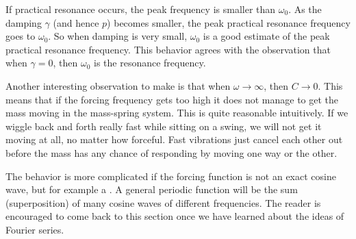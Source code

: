 \documentclass{ximera}
\begin{document}
If practical resonance occurs, the peak frequency is smaller than $\omega_0$.  As the damping $\gamma$ (and hence $p$) becomes smaller, the peak practical resonance frequency goes to $\omega_0$.  So when damping is very small, $\omega_0$ is a good estimate of the peak practical resonance frequency.  This behavior agrees with the observation that when $\gamma=0$, then $\omega_0$ is the resonance frequency.


Another interesting observation to make is that when $\omega \to \infty$, then $C \to 0$.  This means that if the forcing frequency gets too high it does not manage to get the mass moving in the mass-spring system.  This is quite reasonable intuitively. If we wiggle back and forth really fast while sitting on a swing, we will not get it moving at all, no matter how forceful.  Fast vibrations just cancel each other out before the mass has any chance of responding by moving one way or the other. 

The behavior is more complicated if the forcing function is not an exact cosine wave, but for example a . A general periodic function will be the sum (superposition) of many cosine waves of different frequencies. The reader is encouraged to come back to this section once we have learned about the ideas of Fourier series. 
\end{document}
